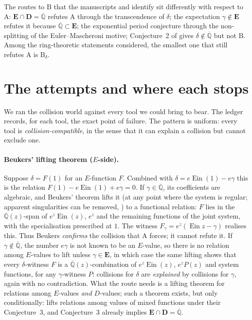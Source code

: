 \documentclass[11pt,a4paper]{article}
\newcommand{\Qbar}{\overline{\mathbb Q}}
\newcommand{\Ein}{\operatorname{Ein}}
\newcommand{\EE}{\mathbf E}
\newcommand{\DD}{\mathbf D}
\theoremstyle{definition}
\theoremstyle{remark}
\numberwithin{equation}{section}
\begin{document}
The routes to $\mathrm B$ that the manuscripts and \cite{FRmixed} identify sit differently
with respect to $\mathrm A$: $\EE\cap\DD=\Qbar$ refutes $\mathrm A$ through the transcendence
of $\delta$; the expectation $\gamma\notin\EE$ \cite{Rivoal2017} refutes it because $\Qbar\subset\EE$; the
exponential period conjecture through the non-splitting of the Euler--Mascheroni motive;
Conjecture~2 of \cite{FRmixed} gives $\delta\notin\Qbar$ but not $\mathrm B$. Among the
ring-theoretic statements considered, the smallest one that still refutes $\mathrm A$ is
$\mathrm B_\delta$.

\section{The attempts and where each stops}\label{II:sec:ledger}

We ran the collision world against every tool we could bring to bear. The ledger records,
for each tool, the exact point of failure. The pattern is uniform: every tool is
\emph{collision-compatible}, in the sense that it can explain a collision but cannot exclude
one.

\paragraph{Beukers' lifting theorem ($E$-side).}
Suppose $\delta=F(1)$ for an $E$-function $F$. Combined with $\delta=e\Ein(1)-e\gamma$
this is the relation $F(1)-e\Ein(1)+e\gamma=0$. If $\gamma\in\Qbar$, its coefficients are
algebraic, and Beukers' theorem \cite[Thm.~1.3]{Beukers} lifts it (at any point where the
system is regular; apparent singularities can be removed, \cite[Thm.~1.5]{Beukers}) to a
functional relation: $F$ lies in the $\Qbar(z)$-span of $e^z\Ein(z)$, $e^z$ and the
remaining functions of the joint system, with the specialisation prescribed at $1$. The
witness $F_\gamma=e^z(\Ein z-\gamma)$ realises this. Thus Beukers \emph{confirms} the
collision that $\mathrm A$ forces; it cannot refute it. If $\gamma\notin\Qbar$, the number
$e\gamma$ is not known to be an $E$-value, so there is no relation among $E$-values to lift
unless $\gamma\in\EE$, in which case the same lifting shows that every $\delta$-witness $F$
is a $\Qbar(z)$-combination of $e^z\Ein(z)$, $e^zP(z)$ and system functions, for any
$\gamma$-witness $P$: collisions for $\delta$ are \emph{explained} by collisions for
$\gamma$, again with no contradiction. What the route needs is a lifting theorem for
relations among $E$-values \emph{and} $D$-values; such a theorem exists, but only
conditionally: \cite[Thm.~4]{FRmixed} lifts relations among values of mixed functions
under their Conjecture~3, and Conjecture~3 already implies $\EE\cap\DD=\Qbar$.
\end{document}
